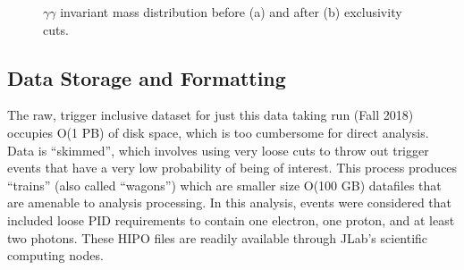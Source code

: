         \begin{figure}[hbt]
            \centering
            \hfill
            \caption[$\gamma \gamma$ Invariant Mass Distribution]{$\gamma \gamma$ invariant mass distribution before (a) and after (b) exclusivity cuts.}
            \label{fig:combined_pion_fig}
        \end{figure}
            


\subsection{Data Storage and Formatting}\label{sec:filtering}
    The raw, trigger inclusive dataset for just this data taking run (Fall 2018) occupies O(1 PB) of disk space, which is too cumbersome for direct analysis. Data is ``skimmed'', which involves using very loose cuts to throw out trigger events that have a very low probability of being of interest. This process produces ``trains'' (also called ``wagons'') which are smaller size O(100 GB) datafiles that are amenable to analysis processing. In this analysis, events were considered that included loose PID requirements to contain one electron, one proton, and at least two photons.  These HIPO files are readily available through JLab's scientific computing nodes. 

